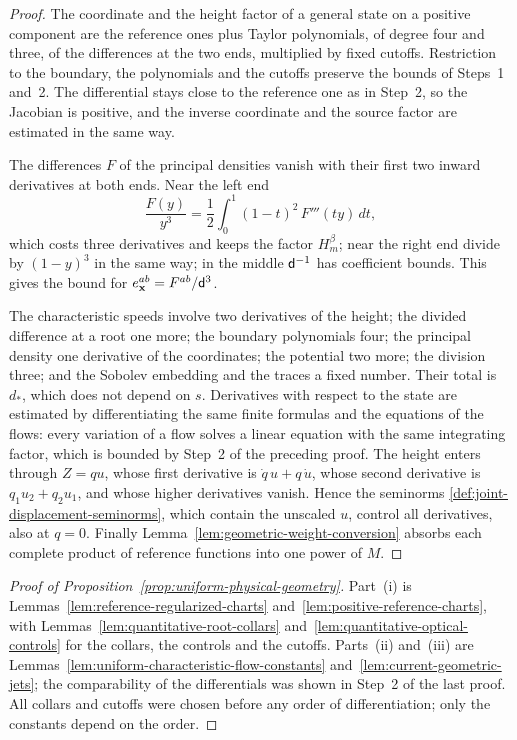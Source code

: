 \begin{proof}
The coordinate and the height factor of a general state on a positive
component are the reference ones plus Taylor polynomials, of degree
four and three, of the differences at the two ends, multiplied by
fixed cutoffs. Restriction to the boundary, the polynomials and the
cutoffs preserve the bounds of Steps~1 and~2. The differential stays
close to the reference one as in Step~2, so the Jacobian is positive,
and the inverse coordinate and the source factor are estimated in the
same way.

The differences $F$ of the principal densities vanish with their
first two inward derivatives at both ends. Near the left end
\[
 \frac{F(y)}{y^3}=\frac12\int_0^1(1-t)^2\,F'''(ty)\,dt,
\]
which costs three derivatives and keeps the factor $H_m^\beta$; near
the right end divide by $(1-y)^3$ in the same way; in the middle
$\mathsf d^{-1}$ has coefficient bounds. This gives the bound for
$e^{ab}_{\mathbf x}=F^{ab}/\mathsf d^3$.

The characteristic speeds involve two derivatives of the height; the
divided difference at a root one more; the boundary polynomials four;
the principal density one derivative of the coordinates; the potential
two more; the division three; and the Sobolev embedding and the
traces a fixed number. Their total is $d_*$, which does not depend on
$s$. Derivatives with respect to the state are estimated by
differentiating the same finite formulas and the equations of the
flows: every variation of a flow solves a linear equation with the
same integrating factor, which is bounded by Step~2 of the preceding
proof. The height enters through $Z=qu$, whose first derivative is
$\dot q\,u+q\,\dot u$, whose second derivative is $q_1u_2+q_2u_1$, and
whose higher derivatives vanish. Hence the seminorms
\eqref{def:joint-displacement-seminorms}, which contain the unscaled
$u$, control all derivatives, also at $q=0$. Finally
Lemma~\ref{lem:geometric-weight-conversion} absorbs each complete
product of reference functions into one power of $M$.
\end{proof}

\begin{proof}[Proof of Proposition~\ref{prop:uniform-physical-geometry}]
Part~(i) is Lemmas~\ref{lem:reference-regularized-charts}
and~\ref{lem:positive-reference-charts}, with
Lemmas~\ref{lem:quantitative-root-collars}
and~\ref{lem:quantitative-optical-controls} for the collars, the
controls and the cutoffs. Parts~(ii) and~(iii) are
Lemmas~\ref{lem:uniform-characteristic-flow-constants}
and~\ref{lem:current-geometric-jets}; the comparability of the
differentials was shown in Step~2 of the last proof. All collars and
cutoffs were chosen before any order of differentiation; only the
constants depend on the order.
\end{proof}

